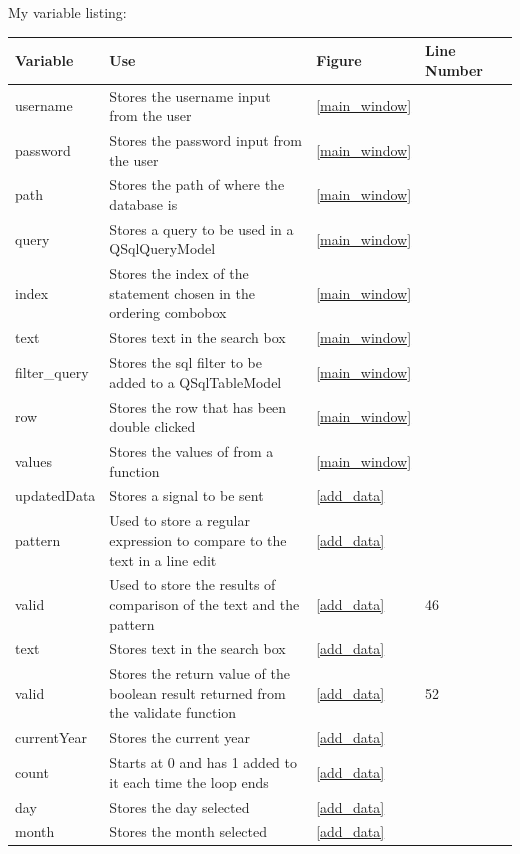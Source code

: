 My variable listing:

\begin{center}
	\begin{longtable}{|p{2cm}|p{2cm}|p{2cm}|p{2cm}|l}
		\hline
		\textbf{Variable}  &  \textbf{Use}  &  \textbf{Figure}  &  \textbf{Line Number} \\ \hline
		username & Stores the username input from the user & \ref{main_window} & \\ \hline
		password & Stores the password input from the user &  \ref{main_window} & \\ \hline
		path & Stores the path of where the database is & \ref{main_window} & \\ \hline
		query & Stores a query to be used in a QSqlQueryModel & \ref{main_window} & \\ \hline
		index & Stores the index of the statement chosen in the ordering combobox & \ref{main_window} & \\ \hline
		text & Stores text in the search box & \ref{main_window} & \\ \hline
		filter\_query & Stores the sql filter to be added to a QSqlTableModel & \ref{main_window} & \\ \hline
		row & Stores the row that has been double clicked & \ref{main_window} & \\ \hline
		values & Stores the values of from a function & \ref{main_window} & \\ \hline
		updatedData & Stores a signal to be sent & \ref{add_data} & \\ \hline
		pattern & Used to store a regular expression to compare to the text in a line edit & \ref{add_data} & \\ \hline
		valid & Used to store the results of comparison of the text and the pattern & \ref{add_data} & 46 \\ \hline
		text & Stores text in the search box & \ref{add_data} & \\ \hline
		valid & Stores the return value of the boolean result returned from the validate function & \ref{add_data} & 52 \\ \hline
		currentYear & Stores the current year & \ref{add_data} & \\ \hline
		count & Starts at 0 and has 1 added to it each time the loop ends & \ref{add_data} & \\ \hline
		day & Stores the day selected & \ref{add_data} & \\ \hline
		month & Stores the month selected & \ref{add_data} & \\ \hline

\end{longtable}
\end{center}
